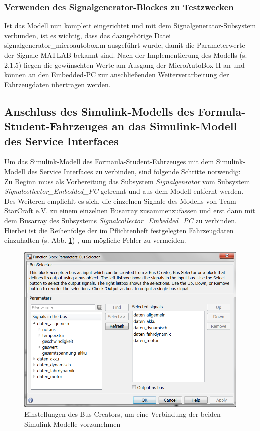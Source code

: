 \documentclass[fontsize = 12pt, paper = a4]{scrreprt}
\begin{document}
\subsubsection{Verwenden des Signalgenerator-Blockes zu Testzwecken}

Ist das Modell nun komplett eingerichtet und mit dem Signalgenerator-Subsystem verbunden, ist es wichtig, dass das dazugehörige Datei signalgenerator\_microautobox.m ausgeführt wurde, damit die Parameterwerte der Signale MATLAB bekannt sind. Nach der Implementierung des Modells (s. 2.1.5) liegen die gewünschten Werte am Ausgang der MicroAutoBox II an und können an den Embedded-PC zur anschließenden Weiterverarbeitung der Fahrzeugdaten übertragen werden.




\subsection{Anschluss des Simulink-Modells des Formula-Student-Fahrzeuges an das Simulink-Modell des Service Interfaces}

Um das Simulink-Modell des Formaula-Student-Fahrzeuges mit dem Simulink-Modell des Service Interfaces zu verbinden, sind folgende Schritte notwendig: \\

Zu Beginn muss als Vorbereitung das Subsystem \textit{Signalgenrator} vom Subsystem \textit{Signalcollector\_Embedded\_PC} getrennt und aus dem Modell entfernt werden. Des Weiteren empfiehlt es sich, die einzelnen Signale des Modells von Team StarCraft e.V. zu einem einzelnen Busarray zusammenzufassen und erst dann mit dem Busarray des Subsystems \textit{Signalcollector\_Embedded\_PC} zu verbinden.
Hierbei ist die Reihenfolge der im Pflichtenheft festgelegten Fahrzeugdaten einzuhalten (s. Abb. \ref{anschlussbus}) , um mögliche Fehler zu vermeiden. 

\begin{figure}[h]
\centering
\includegraphics[scale = 0.45]{anschlussbus}
\caption[Einstellungen des Bus Creators]{Einstellungen des Bus Creators, um eine Verbindung der beiden Simulink-Modelle vorzunehmen}
\label{anschlussbus}
\end{figure} 
\end{document}
